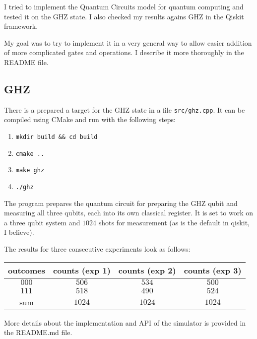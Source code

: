 \documentclass[a4paper,11pt]{article}
\begin{document}
I tried to implement the Quantum Circuits model for quantum computing and tested it on the GHZ state.
I also checked my results agains GHZ in the Qiskit framework.

My goal was to try to implement it in a very general way to allow easier addition of more complicated gates and operations.
I describe it more thoroughly in the README file.

\subsection*{GHZ}
There is a prepared a target for the GHZ state in a file \texttt{src/ghz.cpp}.
It can be compiled using CMake and run with the following steps:
\begin{enumerate}
    \item \texttt{mkdir build \&\& cd build}
    \item \texttt{cmake ..}
    \item \texttt{make ghz}
    \item \texttt{./ghz}
\end{enumerate}
The program prepares the quantum circuit for preparing the GHZ qubit and measuring all three qubits, each into its own classical register.
It is set to work on a three qubit system and $1024$ shots for measurement (as is the default in qiskit, I believe).

The results for three consecutive experiments look as follows:

\begin{table}[ht]
    \centering
    \begin{tabular}{| c | c | c | c |}
        \hline
        outcomes & counts (exp 1) & counts (exp 2) & counts (exp 3) \\
        \hline
        \hline
        $000$    & $506$          & $534$          & $500$          \\
        \hline
        $111$    & $518$          & $490$          & $524$          \\
        \hline
        \hline
        sum      & $1024$         & $1024$         & $1024$         \\
        \hline
    \end{tabular}
\end{table}

More details about the implementation and API of the simulator is provided in the README.md file.
\end{document}
